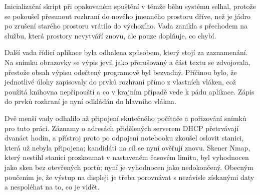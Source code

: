 Inicializační skript při opakovaném spuštění v témže běhu systému selhal, protože se pokoušel přesunout rozhraní do nového jmenného prostoru dříve, než je jádro po zrušení starého prostoru vrátilo do výchozího. Vada zanikla s přechodem na službu, která prostory nevytváří znovu, ale pouze doplňuje, co chybí.

Další vada řídicí aplikace byla odhalena způsobem, který stojí za zaznamenání. Na snímku obrazovky se výpis jevil jako přerušovaný a část textu se zdvojovala, přestože obsah výpisu odečtený programově byl bezvadný. Příčinou bylo, že jednotlivé úlohy zapisovaly do prvků rozhraní přímo z vlastních vláken, což použitá knihovna nepřipouští a co v krajním případě vede k pádu aplikace. Zápis do prvků rozhraní je nyní odkládán do hlavního vlákna.

Dvě menší vady odhalilo až připojení skutečného počítače a pořizování snímků pro tuto práci. Záznamy o adresách přidělených serverem DHCP přetrvávají dvanáct hodin, a přístroj proto po odpojení notebooku zkoušel oslovit stanici, která už nebyla připojena; kandidáti na cíl se nyní ověřují znovu. Skener Nmap, který nestihl stanici prozkoumat v nastaveném časovém limitu, byl vyhodnocen jako sken bez otevřených portů; nyní je vyhodnocen jako nedokončený. Obecným poučením je, že výstup na displeji je třeba porovnávat s nezávisle získanými daty a nespoléhat na to, co je vidět.
